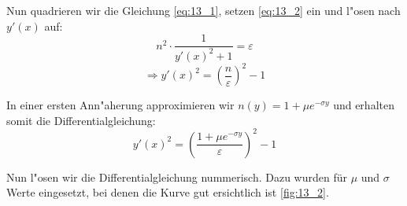 Nun quadrieren wir die Gleichung \ref{eq:13_1}, setzen \ref{eq:13_2} ein und l"osen
nach $y'(x)$ auf:
$$n^2 \cdot \frac{1}{y'(x)^2 + 1} = \varepsilon$$
\begin{equation} \label{eq:13_3}
\Rightarrow y'(x)^2 = \left( \frac{n}{\varepsilon} \right)^2 - 1
\end{equation}

In einer ersten Ann"aherung approximieren wir $n(y) = 1 + \mu e^{-\sigma y}$ und erhalten
somit die Differentialgleichung:
\begin{equation} \label{eq:13_4}
y'(x)^2 = \left( \frac{1 + \mu e^{-\sigma y}}{\varepsilon} \right)^2 - 1
\end{equation}

Nun l"osen wir die Differentialgleichung nummerisch. Dazu wurden für $\mu$ und $\sigma$
Werte eingesetzt, bei denen die Kurve gut ersichtlich ist \ref{fig:13_2}.

